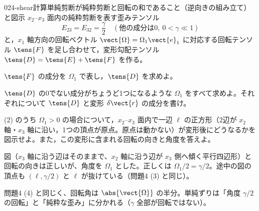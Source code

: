 \documentclass[uplatex,dvipdfmx,a4paper,11pt]{jsarticle}
\begin{document}
\begin{mondai}{024-shear}{計算}{単純剪断が純粋剪断と回転の和であること（逆向きの組み立て）と図示}
$x_2$--$x_3$ 面内の純粋剪断を表す歪みテンソル
  \[ E_{23}=E_{32}=\frac{\gamma}{2}\quad(\text{他の成分は}0,\ 0<\gamma\ll1) \]
  と，$x_1$ 軸方向の回転ベクトル $\vect{\Omega}=\Omega_1\vect{e}_1$ に対応する回転テンソル $\tens{F}$ を足し合わせて，変形勾配テンソル $\tens{D}=\tens{E}+\tens{F}$ を作る。
  \begin{shoumon}
    \item $\tens{F}$ の成分を $\Omega_1$ で表し，$\tens{D}$ を求めよ。
    \item $\tens{D}$ の0でない成分がちょうど1つになるような $\Omega_1$ をすべて求めよ。それぞれについて $\tens{D}$ と変形 $\delta\vect{r}$ の成分を書け。
    \item (2) のうち $\Omega_1>0$ の場合について，$x_2$--$x_3$ 面内で一辺 $\ell$ の正方形（2辺が $x_2$ 軸・$x_3$ 軸に沿い，1つの頂点が原点。原点は動かない）が変形後にどうなるかを図示せよ。また，この変形に含まれる回転の向きと角度を答えよ。
  \end{shoumon}

\begin{kotaeran}
   図（$x_{3}$ 軸に沿う辺はそのままで、$x_{2}$ 軸に沿う辺が $x_{3}$ 側へ傾く平行四辺形）と回転の向きは正しいが、角度を $\Omega_{1}$ とした。正しくは $\Omega_{1}/2=\gamma/2$。途中の図の頂点も $(\ell,\gamma/2)$ と $\ell$ が抜けている（問題4 (3) と同じ）。
\end{kotaeran}
\begin{rikai}
  \item 問題4 (4) と同じく、回転角は $\abs{\vect{\Omega}}$ の半分。単純ずりは「角度 $\gamma/2$ の回転」と「純粋な歪み」に分かれる（$\gamma$ 全部が回転ではない）。
\end{rikai}
\end{mondai}
\end{document}
